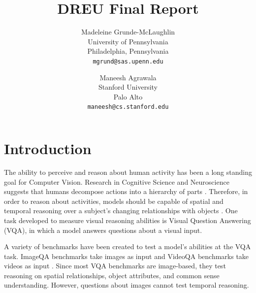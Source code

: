 \documentclass[10pt,twocolumn,letterpaper]{article}
\newcommand{\mgm}[1]{{\color{cyan}{mgm: #1}}}
\begin{document}
\title{DREU Final Report}

\author{Madeleine Grunde-McLaughlin\\
University of Pennsylvania\\
Philadelphia, Pennsylvania\\
{\tt\small mgrund@sas.upenn.edu}
\and
Maneesh Agrawala\\
Stanford University\\
Palo Alto\\
{\tt\small maneesh@cs.stanford.edu}
}

\maketitle


\section{Introduction}


\mgm{High level comment: is this too much or too little detail for an intro? anything else we should include?}

The ability to perceive and reason about human activity has been a long standing goal for Computer Vision. Research in Cognitive Science and Neuroscience suggests that humans decompose actions into a hierarchy of parts \cite{zacks2001events}. Therefore, in order to reason about activities, models should be capable of spatial and temporal reasoning over a subject's changing relationships with objects \cite{ji2020action}. One task developed to measure visual reasoning abilities is Visual Question Answering (VQA), in which a model answers questions about a visual input. 

A variety of benchmarks have been created to test a model's abilities at the VQA task. ImageQA benchmarks take images as input \cite{johnson2017clevr, hudson2019gqa, antol2015vqa, zellers2019recognition, goyal2017making, krishna2017visual, zhu2016visual7w, kim2020answering} and VideoQA benchmarks take videos as input \cite{tapaswi2016movieqa, lei2018tvqa, jang2017tgif, kim2017deepstory, xu2017video, maharaj2017dataset, zeng2016leveraging, yu2019activitynet}. Since most VQA benchmarks are image-based, they test reasoning on spatial relationships, object attributes, and common sense understanding. However, questions about images cannot test temporal reasoning. 
\end{document}
